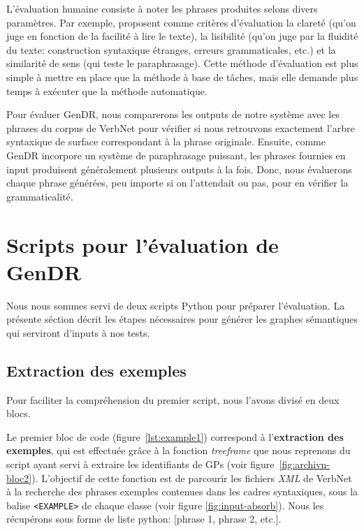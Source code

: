 L'évaluation humaine consiste à noter les phrases produites selons divers paramètres. Par exemple, \cite{BelzFirstSurfaceRealisation2011} proposent comme critères d'évaluation la clareté (qu'on juge en fonction de la facilité à lire le texte), la lisibilité (qu'on juge par la fluidité du texte: construction syntaxique étranges, erreurs grammaticales, etc.) et la similarité de sens (qui teste le paraphrasage). Cette méthode d'évaluation est plus simple à mettre en place que la méthode à base de tâches, mais elle demande plus temps à exécuter que la méthode automatique.

Pour évaluer GenDR, nous comparerons les outputs de notre système avec les phrases du corpus de VerbNet pour vérifier si nous retrouvons exactement l'arbre syntaxique de surface correspondant à la phrase originale. Ensuite, comme GenDR incorpore un système de paraphrasage puissant, les phrases fournies en input produisent généralement plusieurs outputs à la fois. Donc, nous évaluerons chaque phrase générées, peu importe si on l'attendait ou pas, pour en vérifier la grammaticalité.

\section{Scripts pour l'évaluation de GenDR}

Nous nous sommes servi de deux scripts Python pour préparer l'évaluation. La présente séction décrit les étapes nécessaires pour générer les graphes sémantiques qui serviront d'inputs à nos tests.

\subsection{Extraction des exemples}

Pour faciliter la compréhension du premier script, nous l'avons divisé en deux blocs. 

Le premier bloc de code (figure~\ref{lst:example1}) correspond à l'\textbf{extraction des exemples}, qui est effectuée grâce à la fonction \emph{treeframe} que nous reprenons du script ayant servi à extraire les identifiants de \acp{GP} (voir figure~\ref{fig:archivn-bloc2}). L'objectif de cette fonction est de parcourir les fichiers \emph{XML} de VerbNet à la recherche des phrases exemples contenues dans les cadres syntaxiques, sous la balise \texttt{<EXAMPLE>} de chaque classe (voir figure \ref{fig:input-absorb}). Nous les récupérons sous forme de liste python: [phrase 1, phrase 2, etc.].


